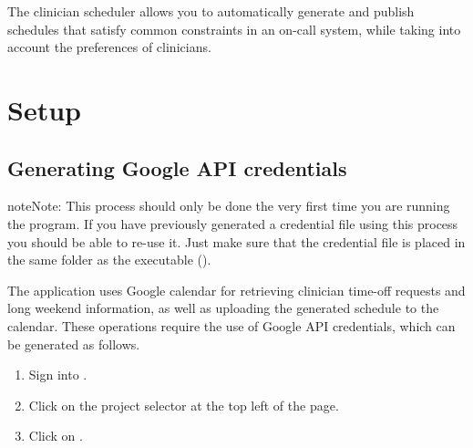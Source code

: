 \documentclass[letterpaper,10pt,english]{sphinxmanual}
\begin{document}
The clinician scheduler allows you to automatically generate and publish
schedules that satisfy common constraints in an on-call system, while taking
into account the preferences of clinicians.


\chapter{Setup}
\label{\detokenize{index:setup}}

\section{Generating Google API credentials}
\label{\detokenize{index:generating-google-api-credentials}}
\begin{sphinxadmonition}{note}{Note:}
This process should only be done the very first time you are running
the program. If you have previously generated a credential file using
this process you should be able to re-use it. Just make sure that the
credential file is placed in the same folder as the executable ().
\end{sphinxadmonition}

The application uses Google calendar for retrieving clinician
time-off requests and long weekend information, as well as uploading the
generated schedule to the calendar. These operations require the use
of Google API credentials, which can be generated as follows.
\begin{enumerate}
\item {} 
Sign into .

\item {} 
Click on the project selector at the top left of the page.

\end{enumerate}

\begin{figure}[htbp]
\centering
{}\end{figure}

\begin{DUlineblock}{0em}
\item[] 
\end{DUlineblock}
\begin{enumerate}
\setcounter{enumi}{2}
\item {} 
Click on .

\end{enumerate}
\end{document}
